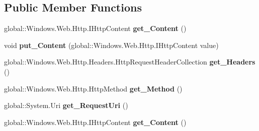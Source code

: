 \subsection*{Public Member Functions}
\begin{DoxyCompactItemize}
\item 
\mbox{\label{interface_windows_1_1_web_1_1_http_1_1_i_http_request_message_a841ab70a054baf88551bb2a7b5d82d84}} 
global\+::\+Windows.\+Web.\+Http.\+I\+Http\+Content {\bfseries get\+\_\+\+Content} ()
\item 
\mbox{\label{interface_windows_1_1_web_1_1_http_1_1_i_http_request_message_a4bd07841801d3cdf596e41166635fe08}} 
void {\bfseries put\+\_\+\+Content} (global\+::\+Windows.\+Web.\+Http.\+I\+Http\+Content value)
\item 
\mbox{\label{interface_windows_1_1_web_1_1_http_1_1_i_http_request_message_a673256b5835bfd09b1edd689fb5333ad}} 
global\+::\+Windows.\+Web.\+Http.\+Headers.\+Http\+Request\+Header\+Collection {\bfseries get\+\_\+\+Headers} ()
\item 
\mbox{\label{interface_windows_1_1_web_1_1_http_1_1_i_http_request_message_a91a5d1f2da9e595f9d1b6c72e674d3dc}} 
global\+::\+Windows.\+Web.\+Http.\+Http\+Method {\bfseries get\+\_\+\+Method} ()
\item 
\mbox{\label{interface_windows_1_1_web_1_1_http_1_1_i_http_request_message_ace91874a34280b89ed6f4237fc3806df}} 
global\+::\+System.\+Uri {\bfseries get\+\_\+\+Request\+Uri} ()
\item 
\mbox{\label{interface_windows_1_1_web_1_1_http_1_1_i_http_request_message_a841ab70a054baf88551bb2a7b5d82d84}} 
global\+::\+Windows.\+Web.\+Http.\+I\+Http\+Content {\bfseries get\+\_\+\+Content} ()
\item 
\mbox{\label{interface_windows_1_1_web_1_1_http_1_1_i_http_request_message_a4bd07841801d3cdf596e41166635fe08}} 

\end{DoxyCompactItemize}
